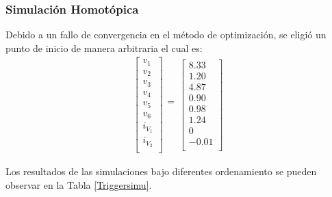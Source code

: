 \documentclass[conference,letterpaper,onecolumn]{IEEEtran}
\begin{document}
\subsubsection{Simulaci\'on Homot\'opica}

Debido a un fallo de convergencia en el m\'etodo de optimizaci\'on, se eligi\'o un punto
de inicio de manera arbitraria el cual es:
\begin{displaymath}
\begin{array}{r}
\left[\begin{array}{r}
v_1 \\ v_2  \\ v_3  \\ v_4 \\ v_5  \\ v_6  \\
i_{V_1}  \\ i_{V_2}  \\
\end{array}\right]
\begin{array}{r}
 \\ = \\ \\
\end{array}
\left[\begin{array}{r}
8.33 \\ 1.20  \\ 4.87 \\ 0.90 \\ 0.98 \\ 1.24 \\
0 \\ -0.01 \\
\end{array}\right]
\end{array}
\end{displaymath}

Los resultados de
las simulaciones bajo diferentes ordenamiento se pueden observar en la Tabla \ref{Triggersimu}.

\begin{table}[!h]
\caption{Simulaciones con el m\'etodo de  Chao del circuito Schmitt-trigger}
\label{Triggersimu}
\end{table}
\end{document}
